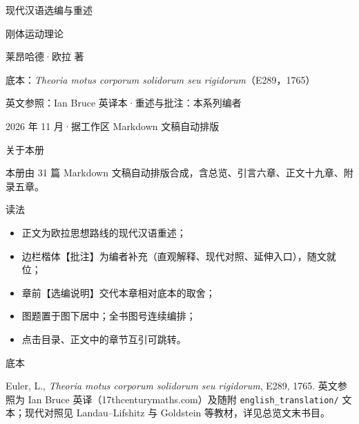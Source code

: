 \begin{titlepage}
\centering
\vspace*{0.24\textheight}
{\color{black!60}现代汉语选编与重述\par}
\vspace{1.1em}
{\heiti 刚体运动理论\par}
\vspace{1.5em}
{莱昂哈德·欧拉 \quad 著\par}
\vspace{2.8em}
{\small\color{black!60}%
底本：\textit{Theoria motus corporum solidorum seu rigidorum}（E289，1765）\par
\vspace{0.3em}
英文参照：Ian Bruce 英译本\quad ·\quad 重述与批注：本系列编者\par}
\vfill
{\footnotesize\color{black!52}2026 年 11 月\quad ·\quad 据工作区 Markdown 文稿自动排版\par}
\end{titlepage}

\thispagestyle{empty}
\vspace*{0.10\textheight}
\begin{fullwidth}
\small
{\heiti{} 关于本册\par}\vspace{0.8em}
本册由 31 篇 Markdown 文稿自动排版合成，含总览、引言六章、正文十九章、附录五章。

\vspace{0.5em}
{\heiti{} 读法\par}\vspace{0.4em}
\begin{itemize}\small
  \item 正文为欧拉思想路线的现代汉语重述；
  \item 边栏楷体【批注】为编者补充（直观解释、现代对照、延伸入口），随文就位；
  \item 章前【选编说明】交代本章相对底本的取舍；
  \item 图题置于图下居中；全书图号连续编排；
  \item 点击目录、正文中的章节互引可跳转。
\end{itemize}

\vspace{0.5em}
{\heiti{} 底本\par}\vspace{0.4em}
Euler, L., \textit{Theoria motus corporum solidorum seu rigidorum}, E289, 1765. 英文参照为 Ian Bruce 英译（17thcenturymaths.com）及随附 \texttt{english\_translation/} 文本；现代对照见 Landau--Lifshitz 与 Goldstein 等教材，详见总览文末书目。
\end{fullwidth}
\clearpage

\renewcommand{\contentsname}{目\quad 录}
\tableofcontents

